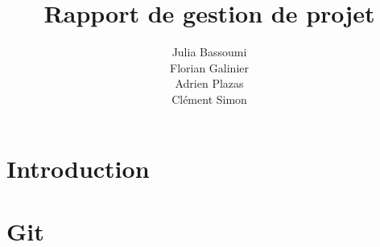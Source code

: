 \documentclass[a4paper,11pt]{report}
\title{Rapport de gestion de projet}
\author{Julia Bassoumi\\Florian Galinier\\Adrien Plazas\\Clément Simon}
\begin{document}
\maketitle
\tableofcontents

\chapter{Introduction}

\chapter{Git}

\end{document}
